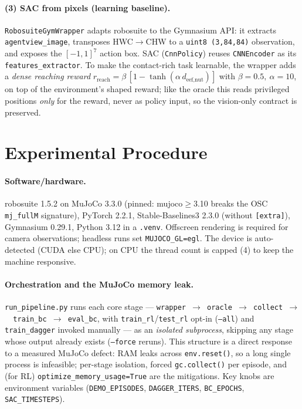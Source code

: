 \documentclass[10pt]{article}
\newcommand{\code}[1]{\texttt{\small #1}}
\begin{document}
\paragraph{(3) SAC from pixels (learning baseline).}
\code{RobosuiteGymWrapper} adapts robosuite to the Gymnasium API: it extracts
\code{agentview\_image}, transposes HWC$\to$CHW to a \code{uint8 (3,84,84)}
observation, and exposes the $[-1,1]^7$ action box. SAC (\code{CnnPolicy}) reuses
\code{CNNEncoder} as its \code{features\_extractor}. To make the contact-rich
task learnable, the wrapper adds a \emph{dense reaching reward}
$r_{\text{reach}} = \beta\,[1-\tanh(\alpha\, d_{\text{eef,nut}})]$ with
$\beta{=}0.5,\ \alpha{=}10$, on top of the environment's shaped reward; like the
oracle this reads privileged positions \emph{only} for the reward, never as policy
input, so the vision-only contract is preserved.

\section{Experimental Procedure}

\paragraph{Software/hardware.} robosuite 1.5.2 on MuJoCo 3.3.0 (pinned:
mujoco$\ge$3.10 breaks the OSC \code{mj\_fullM} signature), PyTorch 2.2.1,
Stable-Baselines3 2.3.0 (without \code{[extra]}), Gymnasium 0.29.1, Python 3.12 in
a \code{.venv}. Offscreen rendering is required for camera observations; headless
runs set \code{MUJOCO\_GL=egl}. The device is auto-detected (CUDA else CPU); on
CPU the thread count is capped (4) to keep the machine responsive.

\paragraph{Orchestration and the MuJoCo memory leak.} \code{run\_pipeline.py}
runs each core stage --- \code{wrapper\,$\to$\,oracle\,$\to$\,collect\,$\to$\,
train\_bc\,$\to$\,eval\_bc}, with \code{train\_rl}/\code{test\_rl} opt-in
(\code{--all}) and \code{train\_dagger} invoked manually --- as an
\emph{isolated subprocess}, skipping any stage whose output already exists
(\code{--force} reruns). This structure is a direct response to a measured MuJoCo
defect: RAM leaks across \code{env.reset()}, so a long single process is
infeasible; per-stage isolation, forced \code{gc.collect()} per episode, and (for
RL) \code{optimize\_memory\_usage=True} are the mitigations. Key knobs are
environment variables (\code{DEMO\_EPISODES}, \code{DAGGER\_ITERS},
\code{BC\_EPOCHS}, \code{SAC\_TIMESTEPS}).
\end{document}
